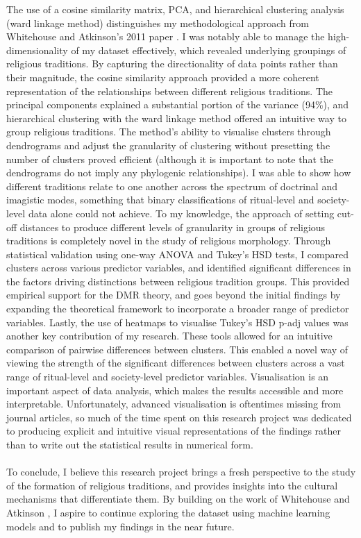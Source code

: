 \documentclass[12pt]{report}
\begin{document}
	The use of a cosine similarity matrix, PCA, and hierarchical clustering analysis (ward linkage method) distinguishes my methodological approach from Whitehouse and Atkinson’s 2011 paper \cite{atkinson2011}. I was notably able to manage the high-dimensionality of my dataset effectively, which revealed underlying groupings of religious traditions. By capturing the directionality of data points rather than their magnitude, the cosine similarity approach provided a more coherent representation of the relationships between different religious traditions. The principal components explained a substantial portion of the variance (94\%), and hierarchical clustering with the ward linkage method offered an intuitive way to group religious traditions. The method's ability to visualise clusters through dendrograms and adjust the granularity of clustering without presetting the number of clusters proved efficient (although it is important to note that the dendrograms do not imply any phylogenic relationships). I was able to show how different traditions relate to one another across the spectrum of doctrinal and imagistic modes, something that binary classifications of ritual-level and society-level data alone could not achieve. To my knowledge, the approach of setting cut-off distances to produce different levels of granularity in groups of religious traditions is completely novel in the study of religious morphology. Through statistical validation using one-way ANOVA and Tukey's HSD tests, I compared clusters across various predictor variables, and identified significant differences in the factors driving distinctions between religious tradition groups. This provided empirical support for the DMR theory, and goes beyond the initial findings by expanding the theoretical framework to incorporate a broader range of predictor variables. Lastly, the use of heatmaps to visualise Tukey’s HSD p-adj values was another key contribution of my research. These tools allowed for an intuitive comparison of pairwise differences between clusters. This enabled a novel way of viewing the strength of the significant differences between clusters across a vast range of ritual-level and society-level predictor variables. Visualisation is an important aspect of data analysis, which makes the results accessible and more interpretable. Unfortunately, advanced visualisation is oftentimes missing from journal articles, so much of the time spent on this research project was dedicated to producing explicit and intuitive visual representations of the findings rather than to write out the statistical results in numerical form.\\
	\\
	To conclude, I believe this research project brings a fresh perspective to the study of the formation of religious traditions, and provides insights into the cultural mechanisms that differentiate them. By building on the work of Whitehouse and Atkinson \cite{atkinson2011}, I aspire to continue exploring the dataset using machine learning models and to publish my findings in the near future.
	
	\nocite{*}
	\printbibliography
	

	\appendix
	\listoffigures
	
\end{document}

